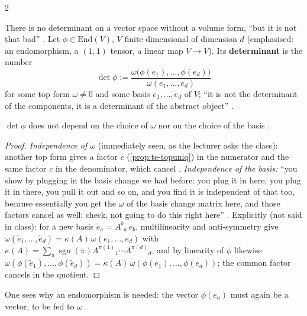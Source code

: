 \begin{paracol}{2}
\begin{definition}\label{def:te-det}
There is no determinant on a vector space without a volume form, ``but it is not that bad'' . Let $\phi\in\mathrm{End}(V)$, $V$ finite dimensional of dimension $d$ (emphasised: an endomorphism, a $(1,1)$ tensor, a linear map $V\to V$). Its \textbf{determinant} is the number
\[
  \det\phi:=\frac{\omega\bigl(\phi(e_1),\dots,\phi(e_d)\bigr)}{\omega(e_1,\dots,e_d)}
\]
for some top form $\omega\ne0$ and some basis $e_1,\dots,e_d$ of $V$; ``it is not the determinant of the components, it is a determinant of the abstract object'' .
\end{definition}
\begin{proposition}\label{prop:te-detwd}
$\det\phi$ does not depend on the choice of $\omega$ nor on the choice of the basis .
\end{proposition}
\begin{proof}
\emph{Independence of $\omega$} (immediately seen, as the lecturer asks the class): another top form gives a factor $c$ (\cref{prop:te-topuniq}) in the numerator and the same factor $c$ in the denominator, which cancel .
\emph{Independence of the basis:} ``you show by plugging in the basis change we had before: you plug it in here, you plug it in there, you pull it out and so on, and you find it is independent of that too, because essentially you get the $\omega$ of the basis change matrix here, and those factors cancel as well; check, not going to do this right here''
.
Explicitly (not said in class): for a new basis $\tilde e_a=A^b{}_a\,e_b$, multilinearity and anti-symmetry give $\omega(\tilde e_1,\dots,\tilde e_d)=\kappa(A)\,\omega(e_1,\dots,e_d)$ with $\kappa(A)=\sum_\pi\operatorname{sgn}(\pi)A^{\pi(1)}{}_1\cdots A^{\pi(d)}{}_d$, and by linearity of $\phi$ likewise
$\omega(\phi(\tilde e_1),\dots,\phi(\tilde e_d))=\kappa(A)\,\omega(\phi(e_1),\dots,\phi(e_d))$; the common factor cancels in the quotient.
\end{proof}
One sees why an endomorphism is needed: the vector $\phi(e_a)$ must again be a vector, to be fed to $\omega$ .


\end{paracol}
